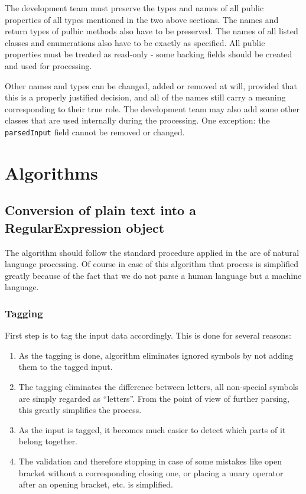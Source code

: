 \documentclass{article}
\begin{document}
The development team must preserve the types and names of all public properties of all types
mentioned in the two above sections. The names and return types of pulbic methods also have to be
preserved. The names of all listed classes and enumerations also have to be exactly as specified.
All public properties must be treated as read-only - some backing fields should be created and used
for processing.

Other names and types can be changed, added or removed at will, provided that this is a properly
justified decision, and all of the names still carry a meaning corresponding to their true role. The
development team may also add some other classes that are used internally during the processing. One
exception: the \verb|parsedInput| field cannot be removed or changed.

\newpage

\section{Algorithms}

\subsection{Conversion of plain text into a RegularExpression object}
The algorithm should follow the standard procedure applied in the are of natural language
processing. Of course in case of this algorithm that process is simplified greatly because of the
fact that we do not parse a human language but a machine language.

\subsubsection{Tagging}
First step is to tag the input data accordingly. This is done for several reasons:

\begin{enumerate}

  \item As the tagging is done, algorithm eliminates ignored symbols by not adding them to the
  tagged input.

  \item The tagging eliminates the difference between letters, all non-special symbols are simply
  regarded as ``letters''. From the point of view of further parsing, this greatly simplifies the
  process.

  \item As the input is tagged, it becomes much easier to detect which parts of it belong together.

  \item The validation and therefore stopping in case of some mistakes like open bracket without a
  corresponding closing one, or placing a unary operator after an opening bracket, etc. is
  simplified.

\end{enumerate}
\end{document}

